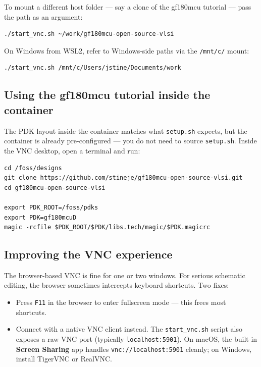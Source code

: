 \documentclass[11pt]{article}
\begin{document}
To mount a different host folder --- say a clone of the gf180mcu
tutorial --- pass the path as an argument:

\begin{lstlisting}
./start_vnc.sh ~/work/gf180mcu-open-source-vlsi
\end{lstlisting}

\noindent On Windows from WSL2, refer to Windows-side paths via the
\texttt{/mnt/c/} mount:

\begin{lstlisting}
./start_vnc.sh /mnt/c/Users/jstine/Documents/work
\end{lstlisting}

\subsection{Using the gf180mcu tutorial inside the container}

The PDK layout inside the container matches what \texttt{setup.sh}
expects, but the container is already pre-configured --- you do not need
to source \texttt{setup.sh}. Inside the VNC desktop, open a terminal and
run:

\begin{lstlisting}
cd /foss/designs
git clone https://github.com/stineje/gf180mcu-open-source-vlsi.git
cd gf180mcu-open-source-vlsi

export PDK_ROOT=/foss/pdks
export PDK=gf180mcuD
magic -rcfile $PDK_ROOT/$PDK/libs.tech/magic/$PDK.magicrc
\end{lstlisting}

\subsection{Improving the VNC experience}

The browser-based VNC is fine for one or two windows. For serious
schematic editing, the browser sometimes intercepts keyboard shortcuts.
Two fixes:

\begin{itemize}[leftmargin=2em]
  \item Press \texttt{F11} in the browser to enter fullscreen mode --- this
        frees most shortcuts.
  \item Connect with a native VNC client instead. The
        \texttt{start\_vnc.sh} script also exposes a raw VNC port
        (typically \texttt{localhost:5901}). On macOS, the built-in
        \textbf{Screen Sharing} app handles \texttt{vnc://localhost:5901}
        cleanly; on Windows, install TigerVNC or RealVNC.
\end{itemize}
\end{document}
